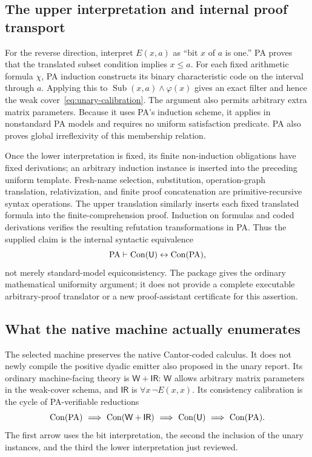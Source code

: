 \subsection{The upper interpretation and internal proof transport}

For the reverse direction, interpret $E(x,a)$ as ``bit $x$ of $a$ is
one.'' PA proves that the translated subset condition implies $x\le a$.
For each fixed arithmetic formula $\chi$, PA induction constructs its
binary characteristic code on the interval through $a$. Applying this to
$\operatorname{Sub}(x,a)\land\varphi(x)$ gives an exact filter and hence
the weak cover~\eqref{eq:unary-calibration}. The argument also permits
arbitrary extra matrix parameters. Because it uses PA's induction scheme,
it applies in nonstandard PA models and requires no uniform satisfaction
predicate. PA also proves global irreflexivity of this membership relation.

Once the lower interpretation is fixed, its finite non-induction
obligations have fixed derivations; an arbitrary induction instance is
inserted into the preceding uniform template. Fresh-name selection,
substitution, operation-graph translation, relativization, and finite proof
concatenation are primitive-recursive syntax operations. The upper
translation similarly inserts each fixed translated formula into the
finite-comprehension proof. Induction on formulas and coded derivations
verifies the resulting refutation transformations in PA. Thus the supplied
claim is the internal syntactic equivalence
\begin{equation}
\label{eq:U-PA-calibration}
 \mathrm{PA}\vdash\operatorname{Con}(\mathsf U)\leftrightarrow\operatorname{Con}(\mathrm{PA}),
\end{equation}
not merely standard-model equiconsistency. The package gives the ordinary
mathematical uniformity argument; it does not provide a complete executable
arbitrary-proof translator or a new proof-assistant certificate for this
assertion.

\subsection{What the native machine actually enumerates}

The selected machine preserves the native Cantor-coded calculus. It does
not newly compile the positive dyadic emitter also proposed in the unary
report. Its ordinary machine-facing theory is $\mathsf W+\mathsf{IR}$:
$\mathsf W$ allows arbitrary matrix parameters in the weak-cover schema,
and $\mathsf{IR}$ is $\forall x\,\neg E(x,x)$. Its consistency calibration
is the cycle of PA-verifiable reductions
\[
 \operatorname{Con}(\mathrm{PA})\ \Longrightarrow\ \operatorname{Con}(\mathsf W+\mathsf{IR})
 \ \Longrightarrow\ \operatorname{Con}(\mathsf U)
 \ \Longrightarrow\ \operatorname{Con}(\mathrm{PA}).
\]
The first arrow uses the bit interpretation, the second the inclusion of
the unary instances, and the third the lower interpretation just reviewed.

